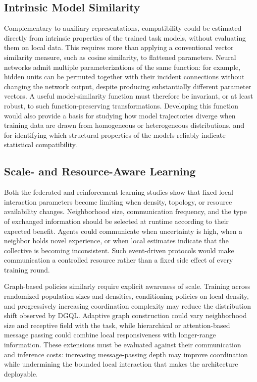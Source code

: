 \subsection{Intrinsic Model Similarity}

Complementary to auxiliary representations, 
 compatibility could be estimated directly from intrinsic properties of the trained task models, 
 without evaluating them on local data. 
% 
This requires more than applying a conventional vector similarity measure, 
 such as cosine similarity, to flattened parameters. 
% 
Neural networks admit multiple parameterizations of the same function: 
 for example, hidden units can be permuted together with their incident connections 
 without changing the network output, despite producing substantially different parameter vectors. 
% 
A useful model-similarity function must therefore be invariant, 
 or at least robust, to such function-preserving transformations.
%
Developing this function would also provide a basis for studying how model trajectories diverge 
 when training data are drawn from homogeneous or heterogeneous distributions, 
 and for identifying which structural properties of the models reliably indicate statistical compatibility.

\subsection{Scale- and Resource-Aware Learning}

Both the federated and reinforcement learning studies show that 
 fixed local interaction parameters become limiting when density, topology, 
 or resource availability changes.
%
Neighborhood size, communication frequency, and the type of exchanged information 
 should be selected at runtime according to their expected benefit.
%
Agents could communicate when uncertainty is high, 
 when a neighbor holds novel experience, or when local estimates indicate that 
 the collective is becoming inconsistent. 
% 
Such event-driven protocols would make communication a controlled
 resource rather than a fixed side effect of every training round.

Graph-based policies similarly require explicit awareness of scale.
%
Training across randomized population sizes and densities, conditioning policies on local density, 
 and progressively increasing coordination complexity may reduce the distribution shift observed by DGQL. 
% 
Adaptive graph construction could vary neighborhood size and receptive field with the task, 
 while hierarchical or attention-based message passing could combine local responsiveness with
 longer-range information. 
% 
These extensions must be evaluated against their communication and inference costs: 
 increasing message-passing depth may improve coordination while undermining the bounded local interaction 
 that makes the architecture deployable.

